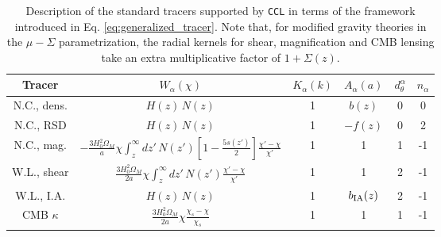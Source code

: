 \documentclass[\docopts]{\docclass}
\begin{document}
  \begin{table}[h]
    \centering
    \begin{tabular}{|c|c|c|c|c|c|}
      \hline
      Tracer & \(\displaystyle W_\alpha(\chi) \) & \(\displaystyle K_\alpha(k) \) & \(\displaystyle A_\alpha(a) \) & $d_\theta^\alpha$ & $n_\alpha$ \\
      \hline
      N.C., dens. & \(\displaystyle H(z)\,N(z)\)                                                                                                   & 1        & $b(z)$          & 0 &  0 \\
      N.C., RSD   & \(\displaystyle H(z)\,N(z)\)                                                                                                   & 1        & $-f(z)$         & 0 &  2 \\
      N.C., mag.  & \(\displaystyle -\frac{3H_0^2\Omega_M}{a}\chi\int_z^\infty dz'\,N(z')\left[1-\frac{5s(z')}{2}\right]\frac{\chi'-\chi}{\chi'}\) & 1        & 1               & 1 & -1 \\
      W.L., shear & \(\displaystyle \frac{3H_0^2\Omega_M}{2a}\chi\int_z^\infty dz'\,N(z')\frac{\chi'-\chi}{\chi'}\)                                & 1        & 1               & 2 & -1 \\
      W.L., I.A.  & \(\displaystyle H(z)\,N(z)\)                                                                                                   & 1        & $b_{\rm IA}(z)$ & 2 & -1 \\
      CMB $\kappa$ & \(\displaystyle \frac{3H_0^2\Omega_M}{2a}\chi\frac{\chi_s-\chi}{\chi_s}\)                                                      & 1        & 1               & 1 & -1 \\
      \hline
    \end{tabular}
    \caption{Description of the standard tracers supported by {\tt CCL} in terms of the framework introduced in Eq. \ref{eq:generalized_tracer}. Note that, for modified gravity theories in the $\mu-\Sigma$ parametrization, the radial kernels for shear, magnification and CMB lensing take an extra multiplicative factor of $1+\Sigma(z)$.}
  \end{table}
\end{document}
